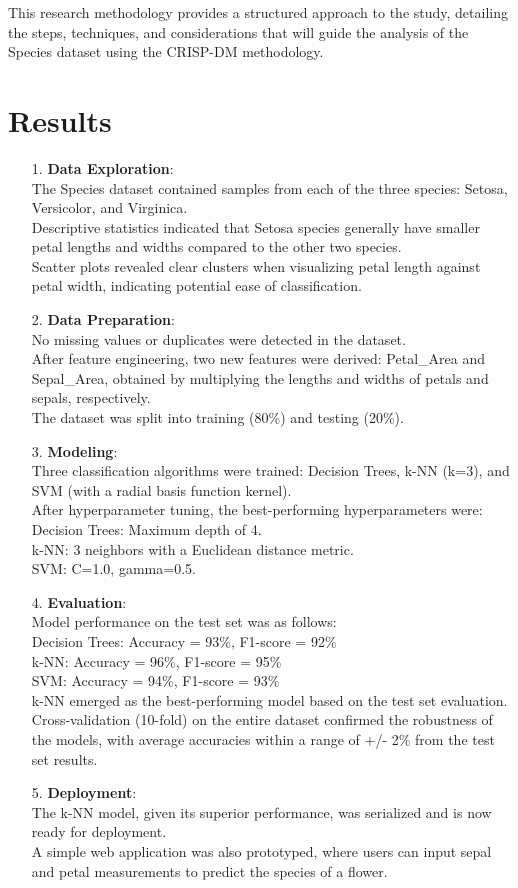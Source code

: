 \documentclass{article}
\begin{document}
This research methodology provides a structured approach to the study, detailing the steps, techniques, and considerations that will guide the analysis of the Species dataset using the CRISP-DM methodology.

\section*{Results} 
\begin{itemize}
    \item[1.]\textbf{Data Exploration}:\\
    The Species dataset contained samples from each of the three species: Setosa, Versicolor, and Virginica.\\
Descriptive statistics indicated that Setosa species generally have smaller petal lengths and widths compared to the other two species.\\
Scatter plots revealed clear clusters when visualizing petal length against petal width, indicating potential ease of classification.
\item[2.]\textbf{Data Preparation}:\\No missing values or duplicates were detected in the dataset.\\
After feature engineering, two new features were derived: Petal\_Area and Sepal\_Area, obtained by multiplying the lengths and widths of petals and sepals, respectively.\\
The dataset was split into training (80\%) and testing (20\%).
\item[3.]\textbf{Modeling}:\\Three classification algorithms were trained: Decision Trees, k-NN (k=3), and SVM (with a radial basis function kernel).\\
After hyperparameter tuning, the best-performing hyperparameters were:\\
Decision Trees: Maximum depth of 4.\\
k-NN: 3 neighbors with a Euclidean distance metric.\\
SVM: C=1.0, gamma=0.5.

\item[4.]\textbf{Evaluation}:\\
Model performance on the test set was as follows:\\
Decision Trees: Accuracy = 93\%, F1-score = 92\%\\
k-NN: Accuracy = 96\%, F1-score = 95\%\\
SVM: Accuracy = 94\%, F1-score = 93\%\\
k-NN emerged as the best-performing model based on the test set evaluation.\\
Cross-validation (10-fold) on the entire dataset confirmed the robustness of the models, with average accuracies within a range of +/- 2\% from the test set results.
\item[5.]\textbf{Deployment}:\\The k-NN model, given its superior performance, was serialized and is now ready for deployment.\\
A simple web application was also prototyped, where users can input sepal and petal measurements to predict the species of a flower.


\end{itemize}
\end{document}
